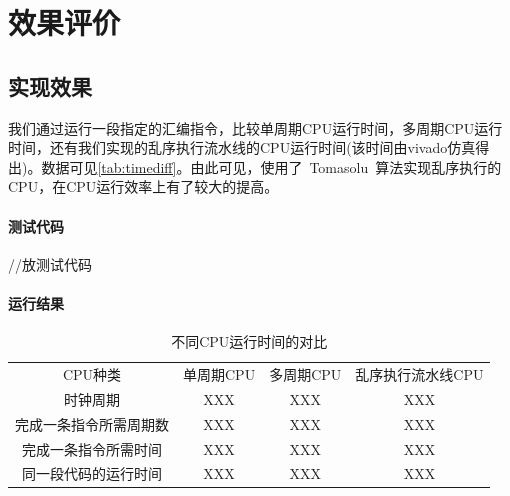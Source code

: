 \documentclass[twoside]{article}
\begin{document}
\section{效果评价}

\subsection{实现效果}
我们通过运行一段指定的汇编指令，比较单周期CPU运行时间，多周期CPU运行时间，还有我们实现的乱序执行流水线的CPU运行时间(该时间由vivado仿真得出)。数据可见\autoref{tab:timediff}。由此可见，使用了~Tomasolu~算法实现乱序执行的CPU，在CPU运行效率上有了较大的提高。\\
\paragraph{测试代码}
\begin{verilogcode}
//放测试代码
\end{verilogcode}
\paragraph{运行结果}
\begin{table}[htp]
    \caption{不同CPU运行时间的对比}
    \centering
    \begin{tabular}{cccc}
        \toprule
        CPU种类 & 单周期CPU & 多周期CPU & 乱序执行流水线CPU \\ 
        时钟周期 & XXX & XXX & XXX \\
        完成一条指令所需周期数 & XXX & XXX & XXX \\
        完成一条指令所需时间 & XXX & XXX & XXX \\
        \midrule
        同一段代码的运行时间 & XXX & XXX & XXX \\
        \bottomrule
    \end{tabular}
    \label{tab:timediff}    
\end{table}
\end{document}

